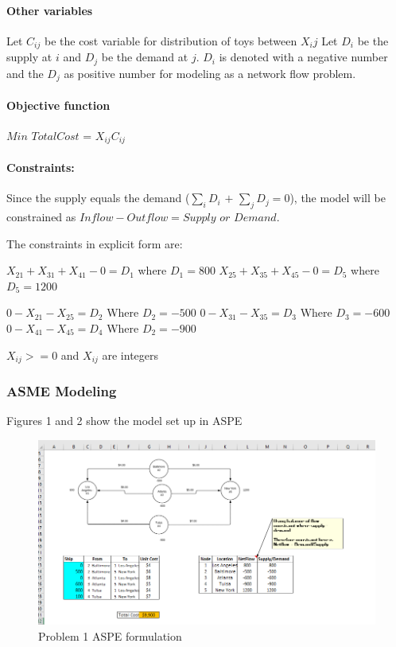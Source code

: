 \documentclass[]{article}
\let\oldparagraph\paragraph
\renewcommand{\paragraph}[1]{\oldparagraph{#1}\mbox{}}
\begin{document}
\paragraph{Other variables}\label{other-variables}

Let \(C_{ij}\) be the cost variable for distribution of toys between
\(X_ij\) Let \(D_{i}\) be the supply at \(i\) and \(D_{j}\) be the
demand at \(j\). \(D_{i}\) is denoted with a negative number and the
\(D_{j}\) as positive number for modeling as a network flow problem.

\paragraph{Objective function}\label{objective-function}

\(Min\) \(Total Cost\) = \(X_{ij}C_{ij}\)

\paragraph{Constraints:}\label{constraints}

Since the supply equals the demand (\(\sum_{i}D_{i}\) \(+\)
\(\sum_{j}D_{j} = 0\)), the model will be constrained as
\(Inflow - Outflow = Supply\) \(or\) \(Demand\).

The constraints in explicit form are:

\(X_{21} + X_{31} + X_{41} - 0 = D_{1}\) where \(D_{1} = 800\)
\(X_{25} + X_{35} + X_{45} - 0 = D_{5}\) where \(D_{5} = 1200\)

\(0 - X_{21} - X_{25} = D_{2}\) Where \(D_{2} = -500\)
\(0 - X_{31} - X_{35} = D_{3}\) Where \(D_{3} = -600\)
\(0 - X_{41} - X_{45} = D_{4}\) Where \(D_{2} = -900\)

\(X_{ij} > = 0\) and \(X_{ij}\) are integers

\subsubsection{ASME Modeling}\label{asme-modeling}

Figures 1 and 2 show the model set up in ASPE

\begin{figure}
\centering
\includegraphics[height=0.50000\textwidth]{Figures/Homework3/p1a.PNG}
\caption{Problem 1 ASPE formulation}
\end{figure}
\end{document}
